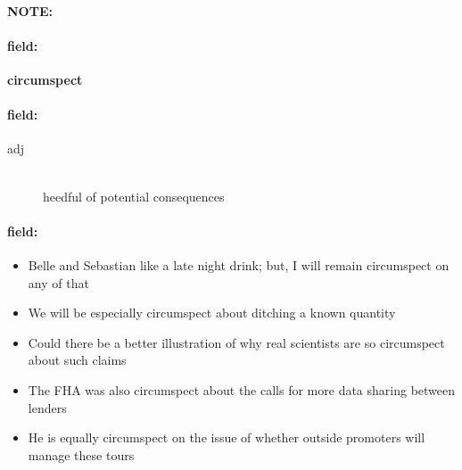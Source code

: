 \documentclass[12pt]{article}
\newenvironment{note}{\paragraph{NOTE:}}{}
\newenvironment{field}{\paragraph{field:}}{}
\begin{document}
\begin{note}
\begin{field}
\textbf{\large circumspect}
\end{field}


\begin{field}
\begin{description}
\item[adj] \hfill \\ 
heedful of potential consequences

\end{description}
\end{field}

\begin{field}
\begin{itemize}
\item Belle and Sebastian like a late night drink; but, I will remain circumspect on any of that
\item We will be especially circumspect about ditching a known quantity
\item Could there be a better illustration of why real scientists are so circumspect about such claims
\item The FHA was also circumspect about the calls for more data sharing between lenders
\item He is equally circumspect on the issue of whether outside promoters will manage these tours
\end{itemize}
\end{field}
\end{note}
\end{document}
